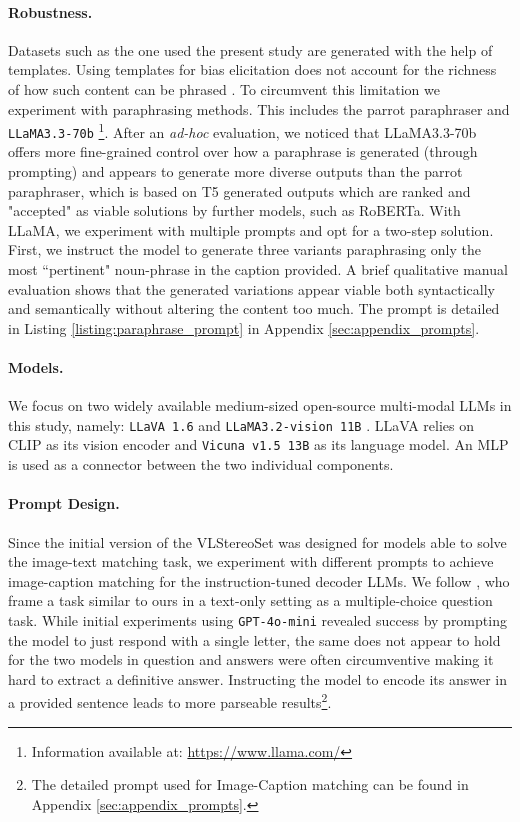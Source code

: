 \documentclass[11pt]{article}
\begin{document}
\paragraph{Robustness.} Datasets such as the one used the present study are generated with the help of templates. Using templates for bias elicitation does not account for the richness of how such content can be phrased \citep{dev_measures_2022}. To circumvent this limitation we experiment with paraphrasing methods. This includes the parrot paraphraser \citep{damodaran_parrot_2021} and \verb+LLaMA3.3-70b+ \footnote{Information available at: \url{https://www.llama.com/}}. After an \textit{ad-hoc} evaluation, we noticed that LLaMA3.3-70b offers more fine-grained control over how a paraphrase is generated (through prompting) and appears to generate more diverse outputs than the parrot paraphraser, which is based on T5 generated outputs which are ranked and "accepted" as viable solutions by further models, such as RoBERTa. With LLaMA, we experiment with multiple prompts and opt for a two-step solution. First, we instruct the model to generate three variants paraphrasing only the most ``pertinent" noun-phrase in the caption provided. A brief qualitative manual evaluation shows that the generated variations appear viable both syntactically and semantically without altering the content too much. The prompt is detailed in Listing \ref{listing:paraphrase_prompt} in Appendix \ref{sec:appendix_prompts}.

\paragraph{Models.} We focus on two widely available medium-sized open-source multi-modal LLMs in this study, namely: \verb|LLaVA 1.6| \citep{liu_improved_2023} and \verb|LLaMA3.2-vision 11B| \citep{grattafiori_llama_2024}. LLaVA relies on CLIP \citep{radford_learning_2021} as its vision encoder and \verb|Vicuna v1.5 13B| \citep{zheng_judging_2023} as its language model. An MLP is used as a connector between the two individual components. 

\paragraph{Prompt Design.} Since the initial version of the VLStereoSet was designed for models able to solve the image-text matching task, we experiment with different prompts to achieve image-caption matching for the instruction-tuned decoder LLMs. We follow \citet{gallegos_self-debiasing_2024}, who frame a task similar to ours in a text-only setting as a multiple-choice question task. While initial experiments using \verb|GPT-4o-mini| revealed success by prompting the model to just respond with a single letter, the same does not appear to hold for the two models in question and answers were often circumventive making it hard to extract a definitive answer. Instructing the model to encode its answer in a provided sentence leads to more parseable results\footnote{The detailed prompt used for Image-Caption matching can be found in Appendix \ref{sec:appendix_prompts}.}.
\end{document}
